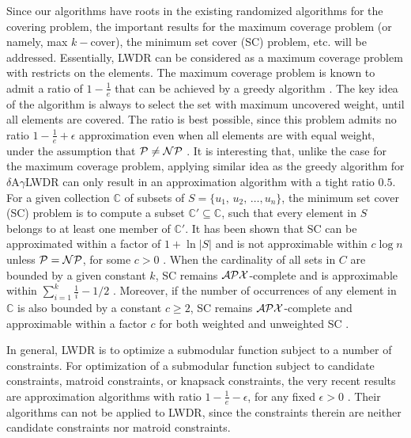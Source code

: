 \documentclass[11pt,english,onecolumn,draftcls]{IEEEtran}
\theoremstyle{plain}
\theoremstyle{plain}
\theoremstyle{plain}
\theoremstyle{plain}
\begin{document}
Since our algorithms have roots in the existing randomized algorithms
for the covering problem, the important results for the maximum coverage
problem (or namely, max $k-$cover), the minimum set cover (SC) problem,
etc. will be addressed. Essentially, LWDR can be considered as a maximum
coverage problem with restricts on the elements. The maximum coverage
problem is known to admit a ratio of $1-\frac{1}{e}$ that can be
achieved by a greedy algorithm \cite{hochbaum1996approximating}.
The key idea of the algorithm is always to select the set with maximum
uncovered weight, until all elements are covered. The ratio is best
possible, since this problem admits no ratio $1-\frac{1}{e}+\epsilon$
approximation even when all elements are with equal weight, under
the assumption that ${\cal P}\neq{\cal NP}$ \cite{feige1998threshold}.
It is interesting that, unlike the case for the maximum coverage problem,
applying similar idea as the greedy algorithm for $\delta$A$\gamma$LWDR
can only result in an approximation algorithm with a tight ratio $0.5$.
For a given collection $\mathbb{C}$ of subsets of $S=\{u_{1},\, u_{2},\,\dots,u_{n}\}$,
the minimum set cover (SC) problem is to compute a subset $\mathbb{C}'\subseteq\mathbb{C}$,
such that every element in $S$ belongs to at least one member of
$\mathbb{C}'$. It has been shown that SC can be approximated within
a factor of $\ensuremath{1+\ln\vert S\vert}$ \cite{johnson1973approximation}
and is not approximable within $c\log n$ unless ${\cal P}={\cal NP}$,
for some $c>0$ \cite{feige1998threshold}. When the cardinality of
all sets in $C$ are bounded by a given constant $k$, SC remains
${\cal APX}$-complete and is approximable within $\sum_{i=1}^{k}\frac{1}{i}-1/2$
\cite{duh1997approximation}. Moreover, if the number of occurrences
of any element in $\mathbb{C}$ is also bounded by a constant $c\geq2$,
SC remains ${\cal APX}$-complete \cite{papadimitriou1988optimization}
and approximable within a factor $c$ for both weighted and unweighted
SC \cite{bar1981linear,hochbaum1982approximation}.

In general, LWDR is to optimize a submodular function subject to a
number of constraints. For optimization of a submodular function subject
to candidate constraints, matroid constraints, or knapsack constraints,
the very recent results are approximation algorithms with ratio $1-\frac{1}{e}-\epsilon$,
for any fixed $\epsilon>0$ \cite{DBLP:conf/soda/BadanidiyuruV14}.
Their algorithms can not be applied to LWDR, since the constraints
therein are neither candidate constraints nor matroid constraints.
\end{document}

